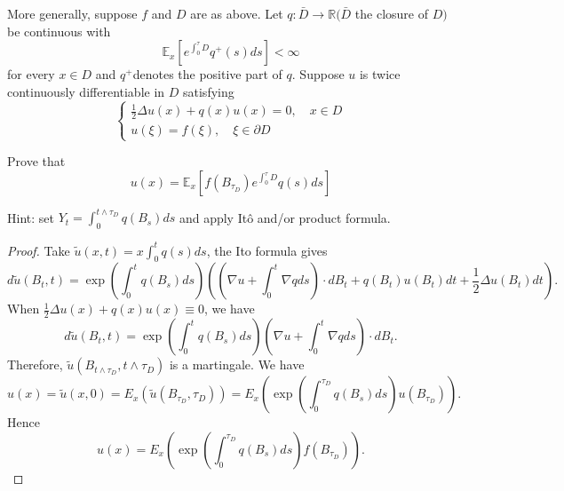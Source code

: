 \begin{problem}
	More generally, suppose $f$ and $D$ are as above. Let $q: \bar{D} \rightarrow \mathbb{R}(\bar{D}$ the closure of $D)$ be continuous with
\[
\mathbb{E}_x\left[e^{\int_0^\tau D} q^{+}(s) d s\right]<\infty
\]
for every $x \in D$ and $q^{+}$denotes the positive part of $q$. Suppose $u$ is twice continuously
differentiable in $D$ satisfying
\[
\left\{\begin{array}{l}
\frac{1}{2} \Delta u(x)+q(x) u(x)=0, \quad x \in D \\
u(\xi)=f(\xi), \quad \xi \in \partial D
\end{array}\right.
\]

Prove that
\[
u(x)=\mathbb{E}_x\left[f\left(B_{\tau_D}\right) e^{\int_0^\tau D} q(s) d s\right]
\]

Hint: set $Y_t=\int_0^{t \wedge \tau_D} q\left(B_s\right) d s$ and apply Itô and/or product formula.
\end{problem}
\begin{proof}
	Take $\tilde u(x, t) = x \int _0^t q(s) ds$, the Ito formula gives
	\[
		d \tilde u(B_t, t) = \exp\left( \int _0^t q(B_s) ds  \right) \left( \left( \nabla u + \int _0^t \nabla q ds \right)   \cdot d B_t
		+ q(B_t) u(B_t) dt + \frac{1}{2} \Delta u(B_t) dt
\right)
	.\] 
	When $\frac{1}{2} \Delta u(x) + q(x) u(x) \equiv 0$, we have 
	\[
		d \tilde u (B_t, t) = \exp\left( \int _0^t q(B_s) ds  \right)  \left( \nabla u + \int _0^t \nabla q ds \right)   \cdot d B_t
	.\] 
	Therefore, $\tilde u\left(B_{t \wedge \tau_D}, t \wedge  \tau_D\right)$ is a martingale. We have
	\[
		u(x) = \tilde u(x, 0) = E_x\left( \tilde u\left( B_{\tau_D}, \tau_D \right)  \right) = E_x \left(  \exp\left( \int _0^{\tau_D} q(B_s) ds  \right)  u\left(B_{\tau_D}\right)   \right) 
	.\] 
	Hence
\[
		u(x) =E_x \left(  \exp\left( \int _0^{\tau_D} q(B_s) ds  \right)  f\left(B_{\tau_D}\right)   \right) 
	.\]

\end{proof}




